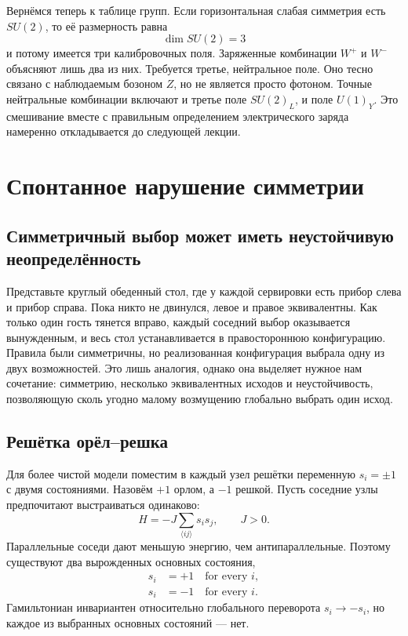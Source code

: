 Вернёмся теперь к таблице групп. Если горизонтальная слабая симметрия есть \(SU(2)\), то её размерность равна
\begin{equation}
  \dim SU(2)=3
\end{equation}
и потому имеется три калибровочных поля. Заряженные комбинации \(W^+\) и \(W^-\) объясняют лишь два из них. Требуется третье, нейтральное поле. Оно тесно связано с наблюдаемым бозоном \(Z\), но не является просто фотоном. Точные нейтральные комбинации включают и третье поле \(SU(2)_L\), и поле \(U(1)_Y\). Это смешивание вместе с правильным определением электрического заряда намеренно откладывается до следующей лекции.

\section{Спонтанное нарушение симметрии}

\subsection{Симметричный выбор может иметь неустойчивую неопределённость}

Представьте круглый обеденный стол, где у каждой сервировки есть прибор слева и прибор справа. Пока никто не двинулся, левое и правое эквивалентны. Как только один гость тянется вправо, каждый соседний выбор оказывается вынужденным, и весь стол устанавливается в правостороннюю конфигурацию. Правила были симметричны, но реализованная конфигурация выбрала одну из двух возможностей. Это лишь аналогия, однако она выделяет нужное нам сочетание: симметрию, несколько эквивалентных исходов и неустойчивость, позволяющую сколь угодно малому возмущению глобально выбрать один исход.

\subsection{Решётка орёл--решка}

Для более чистой модели поместим в каждый узел решётки переменную \(s_i=\pm1\) с двумя состояниями. Назовём \(+1\) орлом, а \(-1\) решкой. Пусть соседние узлы предпочитают выстраиваться одинаково:
\begin{equation}
  H=-J\sum_{\langle ij\rangle}s_i s_j,
  \qquad J>0.
\end{equation}
Параллельные соседи дают меньшую энергию, чем антипараллельные. Поэтому существуют два вырожденных основных состояния,
\begin{equation}
\begin{aligned}
  s_i&=+1\quad\text{for every }i,
  \\
  s_i&=-1\quad\text{for every }i.
\end{aligned}
\end{equation}
Гамильтониан инвариантен относительно глобального переворота \(s_i\to-s_i\), но каждое из выбранных основных состояний — нет.


